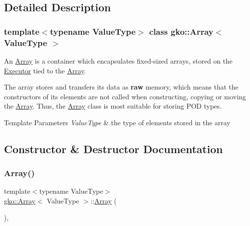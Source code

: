 \subsection{Detailed Description}
\subsubsection*{template$<$typename Value\+Type$>$\newline
class gko\+::\+Array$<$ Value\+Type $>$}

An \hyperlink{classgko_1_1Array}{Array} is a container which encapsulates fixed-\/sized arrays, stored on the \hyperlink{classgko_1_1Executor}{Executor} tied to the \hyperlink{classgko_1_1Array}{Array}. 

The array stores and transfers its data as {\bfseries raw} memory, which means that the constructors of its elements are not called when constructing, copying or moving the \hyperlink{classgko_1_1Array}{Array}. Thus, the \hyperlink{classgko_1_1Array}{Array} class is most suitable for storing P\+OD types.


\begin{DoxyTemplParams}{Template Parameters}
{\em Value\+Type} & the type of elements stored in the array \\
\hline
\end{DoxyTemplParams}


\subsection{Constructor \& Destructor Documentation}
\mbox{\label{classgko_1_1Array_a6048d48c206e8dcae55e776b7adba06a}} 
\subsubsection{\texorpdfstring{Array()}{Array()}\hspace{0.1cm}{\footnotesize\ttfamily [1/11]}}
{\footnotesize\ttfamily template$<$typename Value\+Type$>$ \\
\hyperlink{classgko_1_1Array}{gko\+::\+Array}$<$ Value\+Type $>$\+::\hyperlink{classgko_1_1Array}{Array} (\begin{DoxyParamCaption}{ }\end{DoxyParamCaption})\hspace{0.3cm}{\ttfamily [inline]}, {\ttfamily [noexcept]}}



